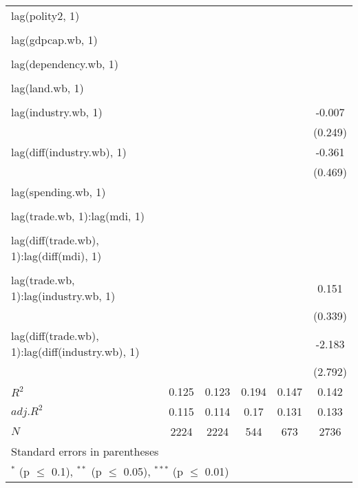 \begin{table}[htbp]
\begin{tabular}{l*{5}{c}}
lag(polity2, 1) 		& 		& 		& 		& 		& \\
  		& 		& 		& 		& 		& \\
lag(gdpcap.wb, 1) 		& 		& 		& 		& 		& \\
  		& 		& 		& 		& 		& \\
lag(dependency.wb, 1) 		& 		& 		& 		& 		& \\
  		& 		& 		& 		& 		& \\
lag(land.wb, 1) 		& 		& 		& 		& 		& \\
  		& 		& 		& 		& 		& \\
lag(industry.wb, 1) 		& 		& 		& 		& 		&-0.007 \\
  		& 		& 		& 		& 		&(0.249) \\
lag(diff(industry.wb), 1) 		& 		& 		& 		& 		&-0.361 \\
  		& 		& 		& 		& 		&(0.469) \\
lag(spending.wb, 1) 		& 		& 		& 		& 		& \\
  		& 		& 		& 		& 		& \\
lag(trade.wb, 1):lag(mdi, 1) 		& 		& 		& 		& 		& \\
  		& 		& 		& 		& 		& \\
lag(diff(trade.wb), 1):lag(diff(mdi), 1) 		& 		& 		& 		& 		& \\
  		& 		& 		& 		& 		& \\
lag(trade.wb, 1):lag(industry.wb, 1) 		& 		& 		& 		& 		&0.151 \\
  		& 		& 		& 		& 		&(0.339) \\
lag(diff(trade.wb), 1):lag(diff(industry.wb), 1) 		& 		& 		& 		& 		&-2.183 \\
  		& 		& 		& 		& 		&(2.792) \\
\hline
$R^2$ 		&0.125 		&0.123 		&0.194 		&0.147 		&0.142 \\
$adj.R^2$ 		&0.115 		&0.114 		&0.17 		&0.131 		&0.133 \\
$N$ 		&\multicolumn{1}{c}{2224} 		&\multicolumn{1}{c}{2224} 		&\multicolumn{1}{c}{544} 		&\multicolumn{1}{c}{673} 		&\multicolumn{1}{c}{2736} \\
\hline\hline
\multicolumn{6}{l}{\footnotesize Standard errors in parentheses}\\
\multicolumn{6}{l}{\footnotesize $^{*}$ (p $\le$ 0.1), $^{**}$ (p $\le$ 0.05), $^{***}$ (p $\le$ 0.01)}\\
\end{tabular}
\end{table}
